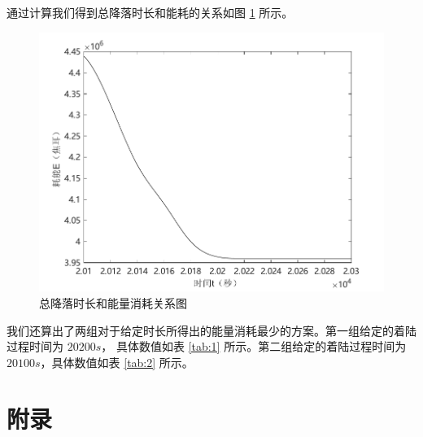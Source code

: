 \documentclass[hyperref,a4paper,UTF8]{ctexart}
\begin{document}
通过计算我们得到总降落时长和能耗的关系如图 \ref{pic:ans2} 所示。
\begin{figure}[ht!]
    \centering
    \includegraphics[scale=0.6]{问题2图像.pdf}
    \caption{总降落时长和能量消耗关系图}
    \label{pic:ans2}
\end{figure}
我们还算出了两组对于给定时长所得出的能量消耗最少的方案。第一组给定的着陆过程时间为 $20200s$，
具体数值如表 \ref{tab:1} 所示。第二组给定的着陆过程时间为 $20100s$，具体数值如表
\ref{tab:2} 所示。
\newpage
\nocite{庞之浩2021}
\nocite{黄翔宇2021}

\section*{附录}
\appendix
\end{document}
